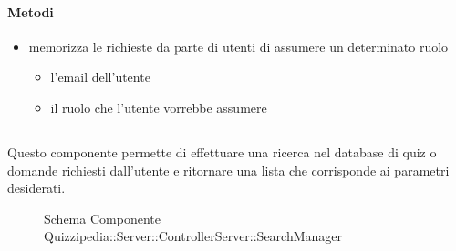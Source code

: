 \paragraph{Metodi}
\begin{itemize}
\item {}
\newline
memorizza le richieste da parte di utenti di assumere un determinato ruolo
\newline
{}
\newline
\begin{itemize}
\item {}
\newline
l'email dell'utente
\item {}
\newline
il ruolo che l'utente vorrebbe assumere
\end{itemize}
\end{itemize}
\subsection{}
Questo componente permette di effettuare una ricerca nel database di quiz o domande richiesti dall'utente e ritornare una lista che corrisponde ai parametri desiderati.
\begin{figure}[H]
\centering
\noindent{}
\caption[Schema Componente Quizzipedia::Server::ControllerServer::SearchManager]{Schema Componente Quizzipedia::Server::ControllerServer::SearchManager}
\end{figure}
